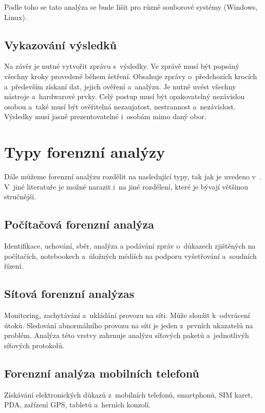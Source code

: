 \documentclass[thesis=B,czech]{FITthesis}[2012/06/26]
\begin{document}
\cite{for_root} Podle toho se tato analýza se bude lišit pro různé souborové systémy (Windows, Linux).

\subsection{Vykazování výsledků}
Na závěr je nutné vytvořit zprávu s~výsledky. Ve zprávě musí být popsáný všechny kroky provedené během šetření. Obsahuje zprávy o~předchozích krocích a~především získaní dat, jejich ověření a~analýzu. Je nutné uvést všechny nástroje a~hardwarové prvky. Celý postup musí být opakovatelný nezávislou osobou a~také musí být ověřitelná nezaujatost, nestrannost a~nezávislost. Výsledky musí jasně prezentovatelné i~osobám mimo daný obor.





\section{Typy forenzní analýzy}
Dále můžeme forenzní analýzu rozdělit na nasledující typy, tak jak je uvedeno v~\cite{for_types}. V~jiné literatuře je možné narazit i~na jiné rozdělení, které je bývají většinou stručnější.

\subsection{Počítačová forenzní analýza}
Identifikace, uchování, sběr, analýza a podávání zpráv o~důkazech zjištěných na počítačích, notebookech a~úložných médiích na podporu vyšetřování a~soudních řízení.

\subsection{Sítová forenzní analýzas}
Monitoring, zachytávání a~ukládání provozu na síti. Může sloužit k~odvrácení útoků. Sledování abnormálního provozu na síti je jeden z~prvních ukazatelů na problém. Analýza této vrstvy zahrnuje analýzu síťových paketů a~jednotlivýh síťových protokolů\cite{carrier2003defining}.

\subsection{Forenzní analýza  mobilních telefonů}
Získávání elektronických důkazů z~mobilních telefonů, smartphonů, SIM karet, PDA, zařízení GPS, tabletů a~herních konzolí.
\end{document}
